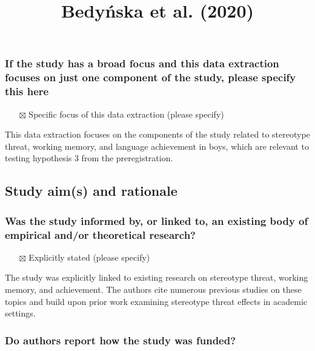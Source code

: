 \documentclass[
  doc, a4paper]{apa7}
\title{Bedyńska et al. (2020)}
\author{\phantom{0}}
\date{}
\affiliation{\phantom{0}}
\providecommand{\tightlist}{%
  \setlength{\itemsep}{0pt}\setlength{\parskip}{0pt}}
\begin{document}
\maketitle

\subsubsection{If the study has a broad focus and this data extraction focuses on just one component of the study, please specify this here}\label{if-the-study-has-a-broad-focus-and-this-data-extraction-focuses-on-just-one-component-of-the-study-please-specify-this-here}

\begin{itemize}
\tightlist
\item[$\boxtimes$]
  Specific focus of this data extraction (please specify)
\end{itemize}

This data extraction focuses on the components of the study related to stereotype threat, working memory, and language achievement in boys, which are relevant to testing hypothesis 3 from the preregistration.

\subsection{Study aim(s) and rationale}\label{study-aims-and-rationale}

\subsubsection{Was the study informed by, or linked to, an existing body of empirical and/or theoretical research?}\label{was-the-study-informed-by-or-linked-to-an-existing-body-of-empirical-andor-theoretical-research}

\begin{itemize}
\tightlist
\item[$\boxtimes$]
  Explicitly stated (please specify)
\end{itemize}

The study was explicitly linked to existing research on stereotype threat, working memory, and achievement. The authors cite numerous previous studies on these topics and build upon prior work examining stereotype threat effects in academic settings.

\subsubsection{Do authors report how the study was funded?}\label{do-authors-report-how-the-study-was-funded}
\end{document}

